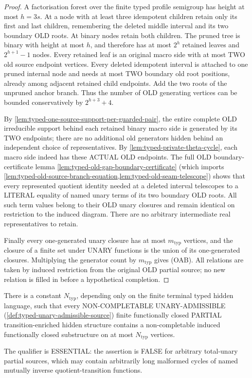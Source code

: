 \begin{proof}
A factorisation forest over
the finite typed profile
semigroup has height at most
\(h=3s\). At a node with
at least three idempotent
children retain only its
first and last children,
remembering the deleted
middle interval and its
two boundary OLD roots.
At binary nodes retain both
children. The pruned tree is
binary with height at most
\(h\), and therefore has at
most \(2^h\) retained leaves
and \(2^{h+1}-1\) nodes.
Every retained leaf is an
original macro side with at
most TWO old source endpoint
vertices. Every deleted
idempotent interval is
attached to one pruned
internal node and needs
at most TWO boundary old
root positions, already
among adjacent retained
child endpoints. Add the
two roots of the unpruned
anchor branch. Thus the
number of OLD generating
vertices can be bounded
conservatively by
\(2^{h+3}+4\).

By
\cref{lem:typed-one-source-support-per-guarded-pair},
the entire complete OLD
irreducible support behind
each retained binary
macro side is generated
by its TWO endpoints;
there are no additional
old generators hidden
behind an independent
choice of representatives.
By
\cref{lem:typed-private-theta-cycle},
each macro side indeed
has these ACTUAL OLD
endpoints. The full
OLD boundary-certificate
lemma
\cref{lem:typed-old-gap-boundary-certificate}
(which imports
\cref{lem:typed-old-source-branch-equation,lem:typed-old-seam-telescope})
shows that every represented
quotient identity needed at
a deleted interval telescopes
to a LITERAL equality of
named unary terms of its
two boundary OLD roots.
All such term values
belong to their OLD
unary closures and remain
identical on restriction
to the induced diagram.
There are no arbitrary
intermediate real
representatives to retain.

Finally every one-generated
unary closure has at most
\(m_{\mathrm{typ}}\)
vertices, and the closure
of a finite set under
UNARY functions is the
union of its
one-generated closures.
Multiplying the
generator count by
\(m_{\mathrm{typ}}\)
gives (OAB). All relations
are taken by induced
restriction from the
original OLD partial
source; no new relation
is filled in before a
hypothetical completion.
\end{proof}

\begin{corollary}
\label{cor:typed-bounded-hidden}
There is a constant \(N_{\mathrm{typ}}\), depending only on the
finite terminal typed hidden language, such that every
NON-COMPLETABLE UNARY-ADMISSIBLE
(\cref{def:typed-unary-admissible-source})
finite functionally closed PARTIAL transition-enriched
hidden structure contains a non-completable induced
functionally closed substructure on at most
\(N_{\mathrm{typ}}\) vertices.

The qualifier is ESSENTIAL: the assertion is FALSE for
arbitrary total-unary partial sources, which may contain
arbitrarily long malformed cycles of named mutually
inverse quotient-transition functions.
\end{corollary}

